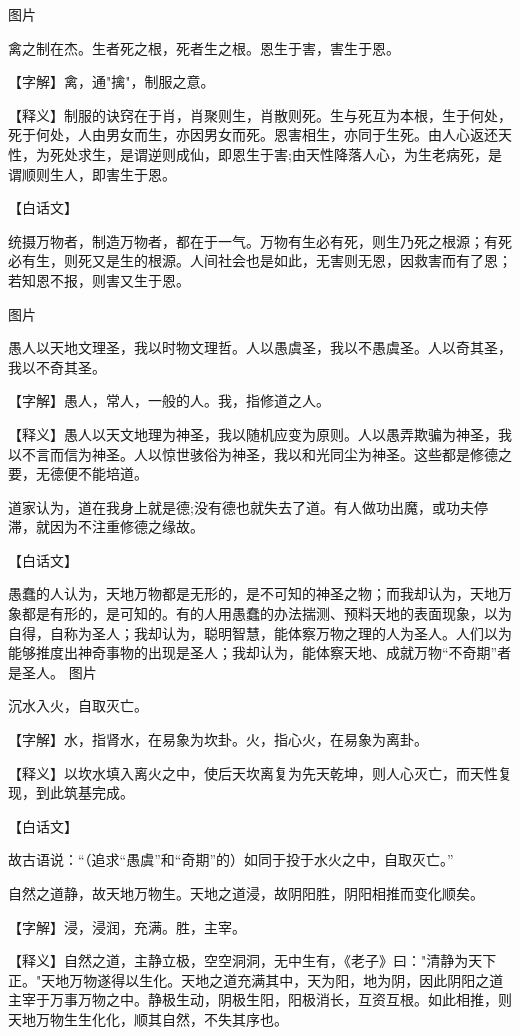 \documentclass[12pt,UTF8]{ctexbook}
\begin{document}
图片​


禽之制在杰。生者死之根，死者生之根。恩生于害，害生于恩。


【字解】禽，通"擒"，制服之意。


【释义】制服的诀窍在于肖，肖聚则生，肖散则死。生与死互为本根，生于何处，死于何处，人由男女而生，亦因男女而死。恩害相生，亦同于生死。由人心返还天性，为死处求生，是谓逆则成仙，即恩生于害;由天性降落人心，为生老病死，是谓顺则生人，即害生于恩。


【白话文】


统摄万物者，制造万物者，都在于一气。万物有生必有死，则生乃死之根源；有死必有生，则死又是生的根源。人间社会也是如此，无害则无恩，因救害而有了恩；若知恩不报，则害又生于恩。


图片​


愚人以天地文理圣，我以时物文理哲。人以愚虞圣，我以不愚虞圣。人以奇其圣，我以不奇其圣。


【字解】愚人，常人，一般的人。我，指修道之人。


【释义】愚人以天文地理为神圣，我以随机应变为原则。人以愚弄欺骗为神圣，我以不言而信为神圣。人以惊世骇俗为神圣，我以和光同尘为神圣。这些都是修德之要，无德便不能培道。


道家认为，道在我身上就是德;没有德也就失去了道。有人做功出魔，或功夫停滞，就因为不注重修德之缘故。


【白话文】


愚蠢的人认为，天地万物都是无形的，是不可知的神圣之物；而我却认为，天地万象都是有形的，是可知的。有的人用愚蠢的办法揣测、预料天地的表面现象，以为自得，自称为圣人；我却认为，聪明智慧，能体察万物之理的人为圣人。人们以为能够推度出神奇事物的出现是圣人；我却认为，能体察天地、成就万物“不奇期”者是圣人。
图片​


沉水入火，自取灭亡。


【字解】水，指肾水，在易象为坎卦。火，指心火，在易象为离卦。


【释义】以坎水填入离火之中，使后天坎离复为先天乾坤，则人心灭亡，而天性复现，到此筑基完成。


【白话文】


故古语说：“（追求“愚虞”和“奇期”的）如同于投于水火之中，自取灭亡。”


自然之道静，故天地万物生。天地之道浸，故阴阳胜，阴阳相推而变化顺矣。


【字解】浸，浸润，充满。胜，主宰。


【释义】自然之道，主静立极，空空洞洞，无中生有，《老子》曰："清静为天下正。"天地万物遂得以生化。天地之道充满其中，天为阳，地为阴，因此阴阳之道主宰于万事万物之中。静极生动，阴极生阳，阳极消长，互资互根。如此相推，则天地万物生生化化，顺其自然，不失其序也。
\end{document}
